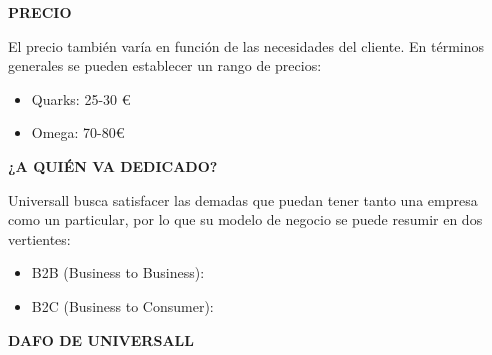 \textbf{PRECIO}

El precio también varía en función de las necesidades del cliente. En términos generales se pueden establecer un rango de precios:
\begin{itemize}
\item Quarks: 25-30 €
\item Omega: 70-80€
\end{itemize}

\textbf{¿A QUIÉN VA DEDICADO?}

Universall busca satisfacer las demadas que puedan tener tanto una empresa como un particular, por lo que su modelo de negocio se puede resumir en dos vertientes: 

\begin{itemize}
\item B2B (Business to Business):
\item B2C (Business to Consumer):
\end{itemize}



\textbf{DAFO DE UNIVERSALL}

